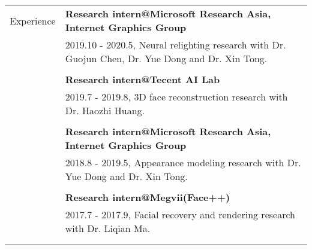 \documentclass[letterpaper,11pt,oneside]{article}
\begin{document}
\begin{tabular}{@{} l l}
 \Large{Experience}
 	& \textbf{Research intern@Microsoft Research Asia, Internet Graphics Group} \\
 	& \parbox{5.0in}{ 2019.10 - 2020.5, Neural relighting research with Dr. Guojun Chen, Dr. Yue Dong and Dr. Xin Tong.}\\
 	& \\
 	& \textbf{Research intern@Tecent AI Lab} \\
	& \parbox{5.0in}{ 2019.7 - 2019.8, 3D face reconstruction research with Dr. Haozhi Huang.}\\
 	& \\    
 	& \textbf{Research intern@Microsoft Research Asia, Internet Graphics Group} \\
    & \parbox{5.0in}{ 2018.8 - 2019.5, Appearance modeling research with Dr. Yue Dong and Dr. Xin Tong.}\\
    & \\
    & \textbf{Research intern@Megvii(Face++)} \\
    & \parbox{5.0in}{2017.7 - 2017.9, Facial recovery and rendering research with Dr. Liqian Ma.}\\
    & \\
     & \\


\end{tabular}
\end{document}
